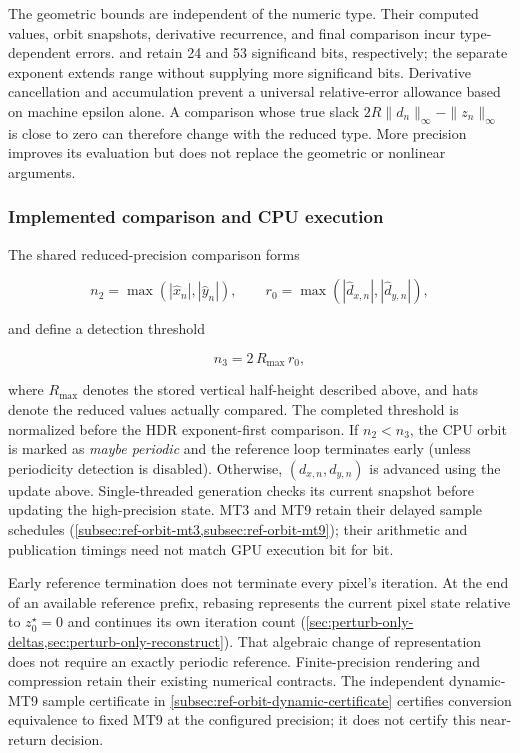 The geometric bounds are independent of the numeric type. Their computed
values, orbit snapshots, derivative recurrence, and final comparison incur
type-dependent errors.  and 
retain 24 and 53 significand bits, respectively; the separate exponent extends
range without supplying more significand bits. Derivative cancellation and
accumulation prevent a universal relative-error allowance based on machine
epsilon alone. A comparison whose true slack
$2R\|d_n\|_\infty-\|z_n\|_\infty$ is close to zero can therefore change
with the reduced type. More precision improves its evaluation but does not
replace the geometric or nonlinear arguments.

\subsubsection{Implemented comparison and CPU execution}

The shared reduced-precision comparison forms

\begin{equation}
  n_2 = \max(|\hat{x}_n|,|\hat{y}_n|),\qquad
  r_0 = \max(|\hat d_{x,n}|,|\hat d_{y,n}|),
  \label{eq:periodicity-norms}
\end{equation}

and define a detection threshold

\begin{equation}
  n_3 = 2\,R_{\max}\,r_0,
  \label{eq:periodicity-threshold}
\end{equation}

where $R_{\max}$ denotes the stored vertical half-height described above,
and hats denote the reduced values actually compared. The completed threshold
is normalized before the HDR exponent-first comparison. If \(n_2 < n_3\),
the CPU orbit is marked as \emph{maybe periodic} and the
reference loop terminates early (unless periodicity detection is disabled).
Otherwise, \((d_{x,n},d_{y,n})\) is advanced using the update above.
Single-threaded generation checks its current snapshot before updating the
high-precision state. MT3 and MT9 retain their delayed sample schedules
(\cref{subsec:ref-orbit-mt3,subsec:ref-orbit-mt9}); their arithmetic and
publication timings need not match GPU execution bit for bit.

Early reference termination does not terminate every pixel's iteration.
At the end of an available reference prefix, rebasing represents the current
pixel state relative to $z_0^\star=0$ and continues its own iteration count
(\cref{sec:perturb-only-deltas,sec:perturb-only-reconstruct}). That algebraic
change of representation does not require an exactly periodic reference.
Finite-precision rendering and compression retain their existing numerical
contracts. The independent dynamic-MT9 sample certificate in
\cref{subsec:ref-orbit-dynamic-certificate} certifies conversion equivalence
to fixed MT9 at the configured precision; it does not certify this near-return decision.

